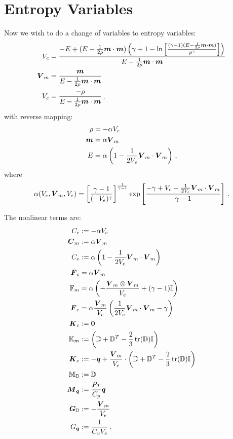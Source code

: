 \documentclass[Dissertation.tex]{subfiles}
\begin{document}
\section{Entropy Variables}
Now we wish to do a change of variables to entropy variables:
\begin{align*}
V_c&=\frac{-E+(E-\frac{1}{2\rho}\boldsymbol m\cdot\boldsymbol m)\left( \gamma+1-\ln\left[ \frac{(\gamma-1)(E-\frac{1}{2\rho}\boldsymbol m\cdot\boldsymbol m)}{\rho^\gamma} \right] \right)}
{E-\frac{1}{2\rho}\boldsymbol m\cdot\boldsymbol m}\\
\boldsymbol V_m&=\frac{\boldsymbol m}{E-\frac{1}{2\rho}\boldsymbol m\cdot\boldsymbol m}\\
V_e&=\frac{-\rho}{E-\frac{1}{2\rho}\boldsymbol m\cdot\boldsymbol m}\,,
\end{align*}
with reverse mapping:
\begin{align*}
\rho&=-\alpha V_e\\
\boldsymbol m&=\alpha\boldsymbol V_m\\
E&=\alpha\left( 1-\frac{1}{2V_e}\boldsymbol V_m\cdot\boldsymbol V_m \right)\,,
\end{align*}
where 
\[
\alpha(V_c,\boldsymbol V_m,V_e)=\left[ \frac{\gamma-1}{(-V_e)^\gamma} \right]^{\frac{1}{\gamma-1}}\exp\left[ \frac{-\gamma+V_c-\frac{1}{2V_e}\boldsymbol V_m\cdot\boldsymbol V_m}{\gamma-1} \right]\,.
\]

The nonlinear terms are:
\begin{align*}
C_c&:=-\alpha V_e\\
\boldsymbol C_m&:=\alpha\boldsymbol V_m\\
C_e&:=\alpha\left( 1-\frac{1}{2V_e}\boldsymbol V_m\cdot\boldsymbol V_m \right)\\
\boldsymbol F_c&=\alpha\boldsymbol V_m\\
\mathbb{F}_m&=\alpha\left( -\frac{\boldsymbol V_m\otimes\boldsymbol V_m}{V_e}+(\gamma-1)\mathbb{I} \right)\\
\boldsymbol F_e&=\alpha\frac{\boldsymbol V_m}{V_e}\left( \frac{1}{2V_e}\boldsymbol V_m\cdot\boldsymbol V_m-\gamma \right)\\
\boldsymbol K_c&:=\boldsymbol 0\\
\mathbb{K}_m&:=\left( \mathbb{D}+\mathbb{D}^T-\frac{2}{3}\operatorname*{tr}(\mathbb{D})\mathbb{I} \right)\\
\boldsymbol K_e&:=-\boldsymbol q+\frac{\boldsymbol V_m}{V_e}\cdot\left( \mathbb{D}+\mathbb{D}^T-\frac{2}{3}\operatorname*{tr}(\mathbb{D})\mathbb{I} \right)\\
\mathbb{M}_{\mathbb{D}}&:=\mathbb{D}\\
\boldsymbol M_{\boldsymbol q}&:=\frac{Pr}{C_p}\boldsymbol q\\
\boldsymbol G_{\mathbb{D}}&:=-\frac{\boldsymbol V_m}{V_e}\\
G_{\boldsymbol q}&:=\frac{1}{C_vV_e}\,.
\end{align*}
\end{document}
